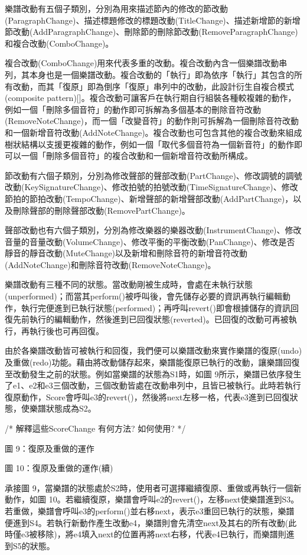 \documentclass[12pt,a4paper,oneside]{report}
\begin{document}
樂譜改動有五個子類別，分別為用來描述節內的修改的節改動(ParagraphChange)、描述標題修改的標題改動(TitleChange)、描述新增節的新增節改動(AddParagraphChange)、刪除節的刪除節改動(RemoveParagraphChange)和複合改動(ComboChange)。

複合改動(ComboChange)用來代表多重的改動。複合改動內含一個樂譜改動串列，其本身也是一個樂譜改動。複合改動的「執行」即為依序「執行」其包含的所有改動，而其「復原」即為倒序「復原」串列中的改動，此設計衍生自複合模式(composite pattern)[]。複合改動可讓客戶在執行期自行組裝各種較複雜的動作，例如一個「刪除多個音符」的動作即可拆解為多個基本的刪除音符改動(RemoveNoteChange)，而一個「改變音符」的動作則可拆解為一個刪除音符改動和一個新增音符改動(AddNoteChange)。複合改動也可包含其他的複合改動來組成樹狀結構以支援更複雜的動作，例如一個「取代多個音符為一個新音符」的動作即可以一個「刪除多個音符」的複合改動和一個新增音符改動所構成。

節改動有六個子類別，分別為修改聲部的聲部改動(PartChange)、修改調號的調號改動(KeySignatureChange)、修改拍號的拍號改動(TimeSignatureChange)、修改節拍的節拍改動(TempoChange)、新增聲部的新增聲部改動(AddPartChange)，以及刪除聲部的刪除聲部改動(RemovePartChange)。

聲部改動也有六個子類別，分別為修改樂器的樂器改動(InstrumentChange)、修改音量的音量改動(VolumeChange)、修改平衡的平衡改動(PanChange)、修改是否靜音的靜音改動(MuteChange)以及新增和刪除音符的新增音符改動(AddNoteChange)和刪除音符改動(RemoveNoteChange)。

樂譜改動有三種不同的狀態。當改動剛被生成時，會處在未執行狀態(unperformed)；而當其perform()被呼叫後，會先儲存必要的資訊再執行編輯動作，執行完便進到已執行狀態(performed)；再呼叫revert()即會根據儲存的資訊回復先前執行的編輯動作，然後進到已回復狀態(reverted)。已回復的改動可再被執行，再執行後也可再回復。

由於各樂譜改動皆可被執行和回復，我們便可以樂譜改動來實作樂譜的復原(undo)及重做(redo)功能。藉由將改動儲存起來，樂譜能復原已執行的改動，讓樂譜回復至改動發生之前的狀態。例如當樂譜的狀態為S1時，如圖 9所示，樂譜已依序發生了e1、e2和e3三個改動，三個改動皆處在改動串列中，且皆已被執行。此時若執行復原動作，Score會呼叫e3的revert()，然後將next左移一格，代表e3進到已回復狀態，使樂譜狀態成為S2。

/*  
解釋這些ScoreChange 有何方法? 如何使用?   
*/ 




圖 9：復原及重做的運作



圖 10：復原及重做的運作(續)

承接圖 9，當樂譜的狀態處於S2時，使用者可選擇繼續復原、重做或再執行一個新動作，如圖 10。若繼續復原，樂譜會呼叫e2的revert()，左移next使樂譜進到S3。若重做，樂譜會呼叫e3的perform()並右移next，表示e3重回已執行的狀態，樂譜便進到S4。若執行新動作產生改動e4，樂譜則會先清空next及其右的所有改動(此時僅e3被移除)，將e4填入next的位置再將next右移，代表e4已執行，而樂譜則進到S5的狀態。
\end{document}
